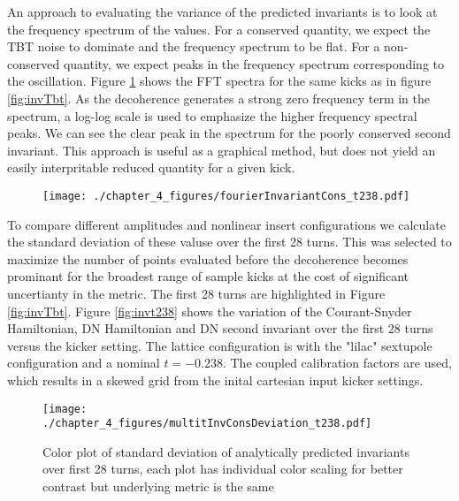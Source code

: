 An approach to evaluating the variance of the predicted invariants is to look at the frequency spectrum of the values. For a conserved quantity, we expect the TBT noise to dominate and the frequency spectrum to be flat. For a non-conserved quantity, we expect peaks in the frequency spectrum corresponding to the oscillation. Figure \ref{fig:invLogLog} shows the FFT spectra for the same kicks as in figure \ref{fig:invTbt}. As the decoherence generates a strong zero frequency term in the spectrum, a log-log scale is used to emphasize the higher frequency spectral peaks. We can see the clear peak in the spectrum for the poorly conserved second invariant. This approach is useful as a graphical method, but does not yield an easily interpritable reduced quantity for a given kick.

\begin{figure}
	\centering
	\texttt{[image: ./chapter\_4\_figures/fourierInvariantCons\_t238.pdf]}
	\caption{}
	\label{fig:invLogLog}
\end{figure}

To compare different amplitudes and nonlinear insert configurations we calculate the standard deviation of these valuse over the first 28 turns. This was selected to maximize the number of points evaluated before the decoherence becomes prominant for the broadest range of sample kicks at the cost of significant uncertianty in the metric. The first 28 turns are highlighted in Figure \ref{fig:invTbt}. Figure \ref{fig:invt238} shows the variation of the Courant-Snyder Hamiltonian, DN Hamiltonian and DN second invariant over the first 28 turns versus the kicker setting. The lattice configuration is with the "lilac" sextupole configuration and a nominal $t=-0.238$. The coupled calibration factors are used, which results in a skewed grid from the inital cartesian input kicker settings.

\begin{figure}
	\centering
	\texttt{[image: ./chapter\_4\_figures/multitInvConsDeviation\_t238.pdf]}
	\caption{Color plot of standard deviation of analytically predicted invariants over first 28 turns, each plot has individual color scaling for better contrast but underlying metric is the same}
	\label{fig:inv238}
\end{figure}

